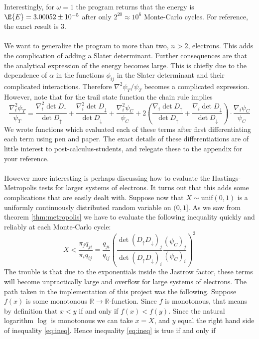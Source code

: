\documentclass[11pt,english,a4paper]{article}
\begin{document}
Interestingly, for $\omega = 1$ the program returns that the energy is $\E{E} = 3.00052\pm 10^{-5}$ after only $2^{20} \approx 10^6$ Monte-Carlo cycles. For reference, the exact result is 3.\\
\\
We want to generalize the program to more than two, $n>2$, electrons. This adds the complication of adding a Slater determinant. Further consequences are that the analytical expression of the energy becomes large. This is chiefly due to the dependence of $\alpha$ in the functions $\phi_{ij}$ in the Slater determinant and their complicated interactions. Therefore $\nabla^2 \psi_T/\psi_T$ becomes a complicated expression. However, note that for the trail state function the chain rule implies
 \[
\frac{\nabla_i^2 \psi_T}{\psi_T} = \frac{\nabla_i^2 \det D_\uparrow}{\det D_\uparrow} + \frac{\nabla_i^2 \det D_\downarrow}{\det D_\downarrow} + \frac{\nabla_i^2 \psi_C}{\psi_C} + 2\left( \frac{\nabla_i \det D_\uparrow}{\det D_\uparrow} + \frac{\nabla_i \det D_\downarrow}{\det D_\downarrow} \right) \cdot \frac{\nabla_i \psi_C}{\psi_C}
\]
We wrote functions which evaluated each of these terms after first differentiating each term using pen and paper. The exact details of these differentiations are of little interest to post-calculus-students, and relegate these to the appendix for your reference.\\
\\
However more interesting is perhaps discussing how to evaluate the Hastings-Metropolis tests for larger systems of electrons. It turns out that this adds some complications that are easily dealt with. Suppose now that $X \sim \mathrm{unif}(0,1)$ is a uniformly continuously distributed random variable on $(0,1]$. As we saw from theorem \ref{thm:metropolis} we have to evaluate the following inequality quickly and reliably at each Monte-Carlo cycle:
\begin{equation}
X < \frac{\pi_jq_{ji}}{\pi_i q_{ij}} = \frac{q_{ji}}{q_{ij}} \left( \frac{\det(D_\uparrow D_\downarrow)_j }{\det(D_\uparrow D_\downarrow)_i} \frac{(\psi_C)_j}{(\psi_C)_i} \right)^2 \label{eq:ineq}
\end{equation}
The trouble is that due to the exponentials inside the Jastrow factor, these terms will become unpractically large and overflow for large systems of electrons. The path taken in the implementation of this project was the following. Suppose $f(x)$ is some monotonous $\mathbb{R} \to \mathbb{R}$-function. Since $f$ is monotonous, that means by definition that $x < y$ if and only if $f(x) < f(y)$. Since the natural logarithm $\log$ is monotonous we can take $x = X$, and $y$ equal the right hand side of inequality \eqref{eq:ineq}. Hence inequality \eqref{eq:ineq} is true if and only if 
\end{document}
